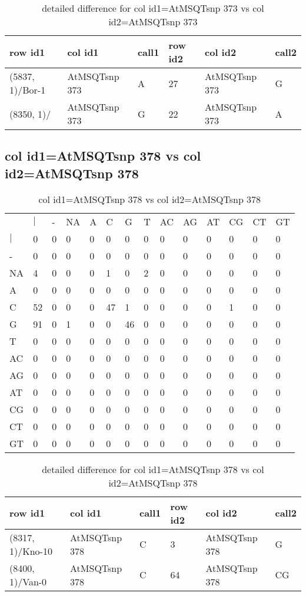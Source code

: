 \begin{center}
\begin{longtable}{|l|l|l|l|l|l|}
\caption{detailed difference for col id1=AtMSQTsnp 373 vs col id2=AtMSQTsnp 373} \label{table_dm699}\\
\hline
row id1&col id1&call1&row id2&col id2&call2\\
\hline
(5837, 1)/Bor-1&AtMSQTsnp 373&A&27&AtMSQTsnp 373&G\\
(8350, 1)/&AtMSQTsnp 373&G&22&AtMSQTsnp 373&A\\
\hline
\end{longtable}
\end{center}

\subsection{col id1=AtMSQTsnp 378 vs col id2=AtMSQTsnp 378}
\begin{center}
\begin{longtable}{|l|l|l|l|l|l|l|l|l|l|l|l|l|l|}
\caption{col id1=AtMSQTsnp 378 vs col id2=AtMSQTsnp 378} \label{table_dm700}\\
\hline
\\
\hline
&$|$&-&NA&A&C&G&T&AC&AG&AT&CG&CT&GT\\
$|$&0&0&0&0&0&0&0&0&0&0&0&0&0\\
-&0&0&0&0&0&0&0&0&0&0&0&0&0\\
NA&4&0&0&0&1&0&2&0&0&0&0&0&0\\
A&0&0&0&0&0&0&0&0&0&0&0&0&0\\
C&52&0&0&0&47&1&0&0&0&0&1&0&0\\
G&91&0&1&0&0&46&0&0&0&0&0&0&0\\
T&0&0&0&0&0&0&0&0&0&0&0&0&0\\
AC&0&0&0&0&0&0&0&0&0&0&0&0&0\\
AG&0&0&0&0&0&0&0&0&0&0&0&0&0\\
AT&0&0&0&0&0&0&0&0&0&0&0&0&0\\
CG&0&0&0&0&0&0&0&0&0&0&0&0&0\\
CT&0&0&0&0&0&0&0&0&0&0&0&0&0\\
GT&0&0&0&0&0&0&0&0&0&0&0&0&0\\
\hline
\end{longtable}
\end{center}

\begin{center}
\begin{longtable}{|l|l|l|l|l|l|}
\caption{detailed difference for col id1=AtMSQTsnp 378 vs col id2=AtMSQTsnp 378} \label{table_dm701}\\
\hline
row id1&col id1&call1&row id2&col id2&call2\\
\hline
(8317, 1)/Kno-10&AtMSQTsnp 378&C&3&AtMSQTsnp 378&G\\
(8400, 1)/Van-0&AtMSQTsnp 378&C&64&AtMSQTsnp 378&CG\\
\hline
\end{longtable}
\end{center}

